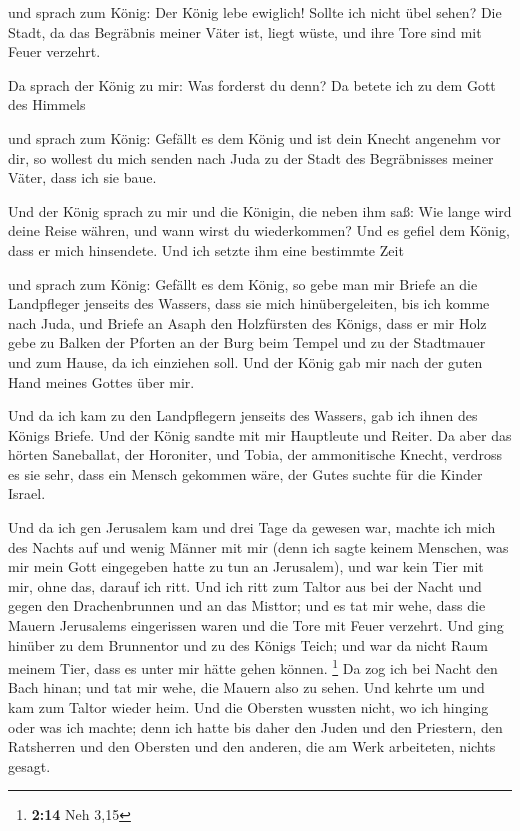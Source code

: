  und sprach zum König: Der König lebe ewiglich! Sollte ich
nicht übel sehen? Die Stadt, da das Begräbnis meiner Väter ist, liegt
wüste, und ihre Tore sind mit Feuer verzehrt.

 Da sprach der König zu mir: Was forderst du denn? Da
betete ich zu dem Gott des Himmels

 und sprach zum König: Gefällt es dem König und ist dein
Knecht angenehm vor dir, so wollest du mich senden nach Juda zu der
Stadt des Begräbnisses meiner Väter, dass ich sie baue.

 Und der König sprach zu mir und die Königin, die neben
ihm saß: Wie lange wird deine Reise währen, und wann wirst du
wiederkommen? Und es gefiel dem König, dass er mich hinsendete. Und ich
setzte ihm eine bestimmte Zeit

 und sprach zum König: Gefällt es dem König, so gebe man
mir Briefe an die Landpfleger jenseits des Wassers, dass sie mich
hinübergeleiten, bis ich komme nach Juda,  und Briefe an
Asaph den Holzfürsten des Königs, dass er mir Holz gebe zu Balken der
Pforten an der Burg beim Tempel und zu der Stadtmauer und zum Hause, da
ich einziehen soll. Und der König gab mir nach der guten Hand meines
Gottes über mir.

 Und da ich kam zu den Landpflegern jenseits des Wassers,
gab ich ihnen des Königs Briefe. Und der König sandte mit mir Hauptleute
und Reiter.  Da aber das hörten Saneballat, der
Horoniter, und Tobia, der ammonitische Knecht, verdross es sie sehr,
dass ein Mensch gekommen wäre, der Gutes suchte für die Kinder Israel.

 Und da ich gen Jerusalem kam und drei Tage da gewesen
war,  machte ich mich des Nachts auf und wenig Männer mit
mir (denn ich sagte keinem Menschen, was mir mein Gott eingegeben hatte
zu tun an Jerusalem), und war kein Tier mit mir, ohne das, darauf ich
ritt.  Und ich ritt zum Taltor aus bei der Nacht und
gegen den Drachenbrunnen und an das Misttor; und es tat mir wehe, dass
die Mauern Jerusalems eingerissen waren und die Tore mit Feuer verzehrt.
 Und ging hinüber zu dem Brunnentor und zu des Königs
Teich; und war da nicht Raum meinem Tier, dass es unter mir hätte gehen
können. \footnote{\textbf{2:14} Neh 3,15}  Da zog ich bei
Nacht den Bach hinan; und tat mir wehe, die Mauern also zu sehen. Und
kehrte um und kam zum Taltor wieder heim.  Und die
Obersten wussten nicht, wo ich hinging oder was ich machte; denn ich
hatte bis daher den Juden und den Priestern, den Ratsherren und den
Obersten und den anderen, die am Werk arbeiteten, nichts gesagt.

